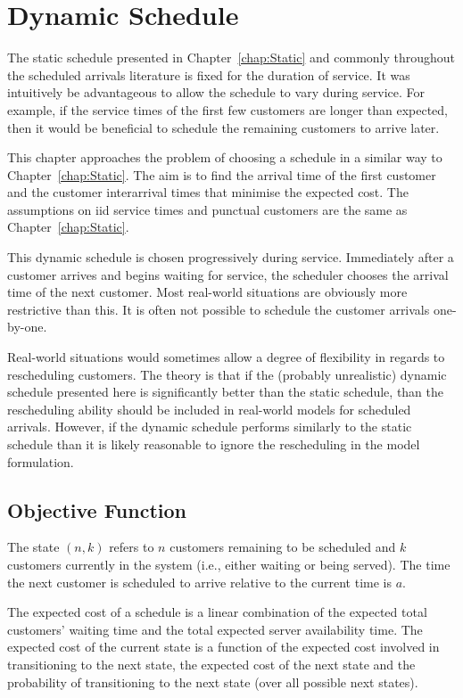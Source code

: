 \chapter{Dynamic Schedule}
\label{chap:Dynamic}
The static schedule presented in Chapter~\ref{chap:Static} and commonly throughout the scheduled arrivals literature is fixed for the duration of service. It was intuitively be advantageous to allow the schedule to vary during service. For example, if the service times of the first few customers are longer than expected, then it would be beneficial to schedule the remaining customers to arrive later.

This chapter approaches the problem of choosing a schedule in a similar way to Chapter~\ref{chap:Static}. The aim is to find the arrival time of the first customer and the customer interarrival times that minimise the expected cost. The assumptions on iid service times and punctual customers are the same as Chapter~\ref{chap:Static}.

This dynamic schedule is chosen progressively during service. Immediately after a customer arrives and begins waiting for service, the scheduler chooses the arrival time of the next customer. Most real-world situations are obviously more restrictive than this. It is often not possible to schedule the customer arrivals one-by-one.

Real-world situations would sometimes allow a degree of flexibility in regards to rescheduling customers. The theory is that if the (probably unrealistic) dynamic schedule presented here is significantly better than the static schedule, than the rescheduling ability should be included in real-world models for scheduled arrivals. However, if the dynamic schedule performs similarly to the static schedule than it is likely reasonable to ignore the rescheduling in the model formulation.

\section{Objective Function}
The state $(n, k)$ refers to $n$ customers remaining to be scheduled and $k$ customers currently in the system (i.e., either waiting or being served). The time the next customer is scheduled to arrive relative to the current time is $a$.

The expected cost of a schedule is a linear combination of the expected total customers' waiting time and the total expected server availability time. The expected cost of the current state is a function of the expected cost involved in transitioning to the next state, the expected cost of the next state and the probability of transitioning to the next state (over all possible next states).

